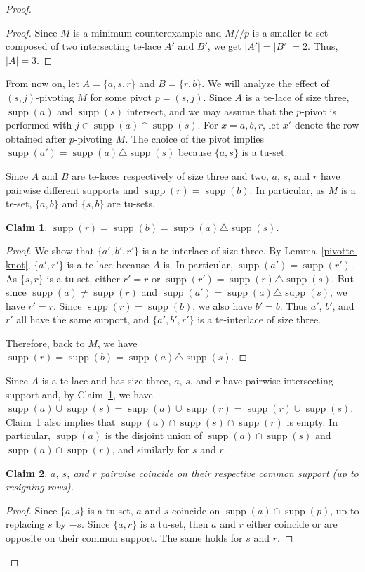 \documentclass[11pt,a4paper]{amsart}
\theoremstyle{plain}
\newtheorem{claimnumb}{Claim}[theorem]{\itshape}{\rmfamily}
\theoremstyle{definition}
\DeclareMathOperator{\supp}{supp}
\begin{document}
\begin{proof}
\begin{proof}
Since $M$ is a minimum counterexample and $M/\!\!/p$ is a smaller te-set composed of two intersecting te-lace $A'$ and $B'$, we get $|A'|=|B'|=2$.
Thus, $|A|=3$.
\end{proof}

From now on, let $A=\{a,s,r\}$ and $B=\{r,b\}$.
We will analyze the effect of $(s,j)$-pivoting $M$ for some pivot $p=(s,j)$.
Since $A$ is a te-lace of size three, $\supp(a)$ and $\supp(s)$ intersect, and we may assume that the $p$-pivot is performed with $j\in\supp(a)\cap\supp(s)$.
For $x=a,b,r$, let $x'$ denote the row obtained after $p$-pivoting $M$.
The choice of the pivot implies $\supp(a')=\supp(a)\triangle \supp(s)$ because $\{a,s\}$ is a tu-set.

Since $A$ and $B$ are te-laces respectively of size three and two, $a$, $s$, and $r$ have pairwise different supports and $\supp(r)=\supp(b)$.
In particular, as $M$ is a te-set, $\{a,b\}$ and $\{s,b\}$ are tu-sets.

\begin{claimnumb}\label{cl4}
$\supp(r)=\supp(b)=\supp(a)\triangle\supp(s)$.
\end{claimnumb}
\begin{proof}
We show that $\{a',b',r'\}$ is a te-interlace of size three.
By Lemma~\ref{pivotte-knot}, $\{a',r'\}$ is a te-lace because $A$ is.
In particular, $\supp(a')=\supp(r')$.
As $\{s,r\}$ is a tu-set, either $r'=r$ or $\supp(r')=\supp(r)\triangle \supp(s)$.
But since $\supp(a)\neq \supp(r)$ and $\supp(a')=\supp(a)\triangle \supp(s)$, we have $r'=r$.
Since $\supp(r)=\supp(b)$, we also have $b'=b$.
Thus $a'$, $b'$, and $r'$ all have the same support, and $\{a',b',r'\}$ is a te-interlace of size three.

Therefore, back to $M$, we have $\supp(r)=\supp(b)=\supp(a)\triangle\supp(s)$. %
\end{proof}

Since $A$ is a te-lace and has size three, $a$, $s$, and $r$ have pairwise intersecting support and, by Claim~\ref{cl4}, we have $\supp(a)\cup \supp(s)=\supp(a)\cup \supp(r)=\supp(r)\cup \supp(s)$.
Claim~\ref{cl4} also implies that $\supp(a)\cap \supp(s)\cap \supp(r)$ is empty.
In particular, $\supp(a)$ is the disjoint union of $\supp(a)\cap\supp(s)$ and $\supp(a)\cap\supp(r)$, and similarly for $s$ and $r$.

\begin{claimnumb}\label{cl5}
$a$, $s$, and $r$ pairwise coincide on their respective common support (up to resigning rows).
\end{claimnumb}
\begin{proof}
Since $\{a,s\}$ is a tu-set, $a$ and $s$ coincide on $\supp(a)\cap\supp(p)$, up to replacing $s$ by $-s$.
Since $\{a,r\}$ is a tu-set, then $a$ and $r$ either coincide or are opposite on their common support.
The same holds for $s$ and $r$.


\end{proof}
\end{proof}
\end{document}
